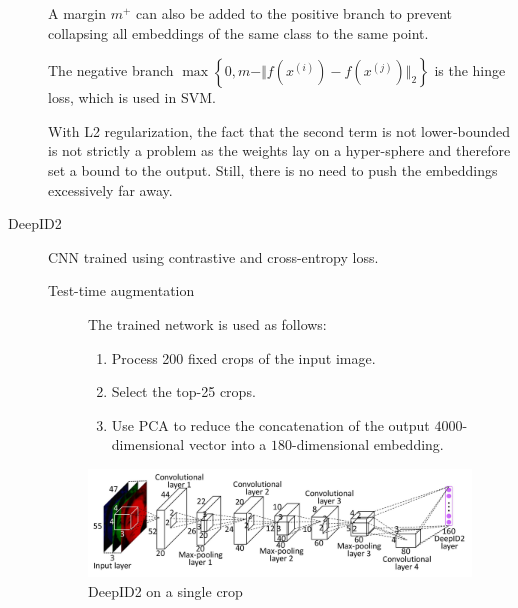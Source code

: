 \begin{description}
            \begin{remark}
                A margin $m^+$ can also be added to the positive branch to prevent collapsing all embeddings of the same class to the same point.
            \end{remark}

            \begin{remark}
                The negative branch $\max\left\{0, m - \Vert f(x^{(i)}) - f(x^{(j)}) \Vert_2\right\}$ is the hinge loss, which is used in SVM.
            \end{remark}

            \begin{remark}
                With L2 regularization, the fact that the second term is not lower-bounded is not strictly a problem as the weights lay on a hyper-sphere and therefore set a bound to the output. Still, there is no need to push the embeddings excessively far away.
            \end{remark}

    \item[DeepID2] 
            CNN trained using contrastive and cross-entropy loss.

            \begin{description}
                \item[Test-time augmentation]
                    The trained network is used as follows:
                    \begin{enumerate}
                        \item Process 200 fixed crops of the input image.
                        \item Select the top-25 crops.
                        \item Use PCA to reduce the concatenation of the output $4000$-dimensional vector into a $180$-dimensional embedding.
                    \end{enumerate}
            \end{description}

            \begin{figure}[H]
                \centering
                \includegraphics[width=0.7\linewidth]{./img/deepid2.jpg}
                \caption{DeepID2 on a single crop}
            \end{figure}
\end{description}

